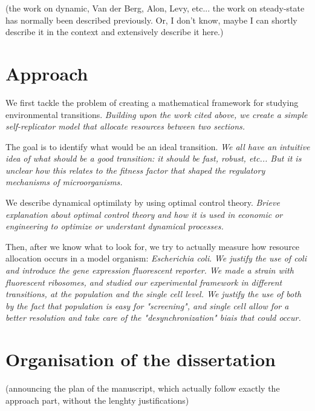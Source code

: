 (the work on dynamic, Van der Berg, Alon, Levy, etc... the work on steady-state has normally been described previously. Or, I don't know, maybe I can shortly describe it in the context and extensively describe it here.)

\section{Approach}

We first tackle the problem of creating a mathematical framework for studying environmental transitions.
\textit{Building upon the work cited above, we create a simple self-replicator model that allocate resources between two sections.}

The goal is to identify what would be an ideal transition.
\textit{We all have an intuitive idea of what should be a good transition: it should be fast, robust, etc... But it is unclear how this relates to the fitness factor that shaped the regulatory mechanisms of microorganisms.}

We describe dynamical optimilaty by using optimal control theory.
\textit{Brieve explanation about optimal control theory and how it is used in economic or engineering to optimize or understant dynamical processes.}

Then, after we know what to look for, we try to actually measure how resource allocation occurs in a model organism: \textit{Escherichia coli}.
\textit{We justify the use of coli and introduce the gene expression fluorescent reporter.
We made a strain with fluorescent ribosomes, and studied our experimental framework in different transitions, at the population and the single cell level.
We justify the use of both by the fact that population is easy for "screening", and single cell allow for a better resolution and take care of the "desynchronization" biais that could occur.}

\section{Organisation of the dissertation}

(announcing the plan of the manuscript, which actually follow exactly the approach part, without the lenghty justifications)